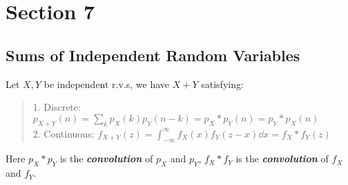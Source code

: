 \section{Section 7}
\subsection{Sums of Independent Random Variables}
\begin{definition}
    Let $X, Y$ be independent r.v.s, we have $X + Y$ satisfying:
    \begin{quote}
        1. Discrete: $p_{X + Y}(n) = \sum_{k} p_X(k)p_Y(n-k) = p_X * p_Y(n) = p_Y * p_X(n)$ \\
        2. Continuous: $f_{X + Y}(z) = \int_{-\infty}^{\infty} f_X(x)f_Y(z-x)\dd x = f_X * f_Y(z)$
    \end{quote}
\end{definition}
Here $p_X * p_Y$ is the \textbf{\textit{convolution}} of $p_X$ and $p_Y$, $f_X * f_Y$ is the \textbf{\textit{convolution}} of $f_X$ and $f_Y$.

\newpage
